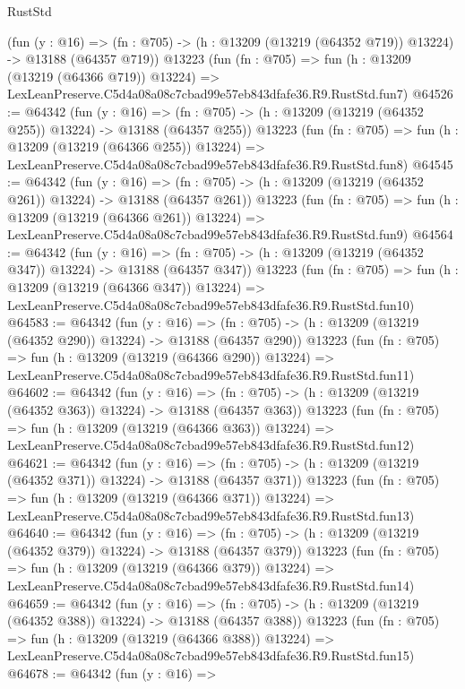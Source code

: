 \begin{lexlean}{RustStd}
\begin{coremodule}
    (fun (y : @16) =>
    (fn : @705) -> (h : @13209 (@13219 (@64352 @719)) @13224) -> @13188 (@64357 @719))
    @13223
    (fun (fn : @705) =>
    fun (h : @13209 (@13219 (@64366 @719)) @13224) =>
    LexLeanPreserve.C5d4a08a08c7cbad99e57eb843dfafe36.R9.RustStd.fun7)
@64526 := @64342
    (fun (y : @16) =>
    (fn : @705) -> (h : @13209 (@13219 (@64352 @255)) @13224) -> @13188 (@64357 @255))
    @13223
    (fun (fn : @705) =>
    fun (h : @13209 (@13219 (@64366 @255)) @13224) =>
    LexLeanPreserve.C5d4a08a08c7cbad99e57eb843dfafe36.R9.RustStd.fun8)
@64545 := @64342
    (fun (y : @16) =>
    (fn : @705) -> (h : @13209 (@13219 (@64352 @261)) @13224) -> @13188 (@64357 @261))
    @13223
    (fun (fn : @705) =>
    fun (h : @13209 (@13219 (@64366 @261)) @13224) =>
    LexLeanPreserve.C5d4a08a08c7cbad99e57eb843dfafe36.R9.RustStd.fun9)
@64564 := @64342
    (fun (y : @16) =>
    (fn : @705) -> (h : @13209 (@13219 (@64352 @347)) @13224) -> @13188 (@64357 @347))
    @13223
    (fun (fn : @705) =>
    fun (h : @13209 (@13219 (@64366 @347)) @13224) =>
    LexLeanPreserve.C5d4a08a08c7cbad99e57eb843dfafe36.R9.RustStd.fun10)
@64583 := @64342
    (fun (y : @16) =>
    (fn : @705) -> (h : @13209 (@13219 (@64352 @290)) @13224) -> @13188 (@64357 @290))
    @13223
    (fun (fn : @705) =>
    fun (h : @13209 (@13219 (@64366 @290)) @13224) =>
    LexLeanPreserve.C5d4a08a08c7cbad99e57eb843dfafe36.R9.RustStd.fun11)
@64602 := @64342
    (fun (y : @16) =>
    (fn : @705) -> (h : @13209 (@13219 (@64352 @363)) @13224) -> @13188 (@64357 @363))
    @13223
    (fun (fn : @705) =>
    fun (h : @13209 (@13219 (@64366 @363)) @13224) =>
    LexLeanPreserve.C5d4a08a08c7cbad99e57eb843dfafe36.R9.RustStd.fun12)
@64621 := @64342
    (fun (y : @16) =>
    (fn : @705) -> (h : @13209 (@13219 (@64352 @371)) @13224) -> @13188 (@64357 @371))
    @13223
    (fun (fn : @705) =>
    fun (h : @13209 (@13219 (@64366 @371)) @13224) =>
    LexLeanPreserve.C5d4a08a08c7cbad99e57eb843dfafe36.R9.RustStd.fun13)
@64640 := @64342
    (fun (y : @16) =>
    (fn : @705) -> (h : @13209 (@13219 (@64352 @379)) @13224) -> @13188 (@64357 @379))
    @13223
    (fun (fn : @705) =>
    fun (h : @13209 (@13219 (@64366 @379)) @13224) =>
    LexLeanPreserve.C5d4a08a08c7cbad99e57eb843dfafe36.R9.RustStd.fun14)
@64659 := @64342
    (fun (y : @16) =>
    (fn : @705) -> (h : @13209 (@13219 (@64352 @388)) @13224) -> @13188 (@64357 @388))
    @13223
    (fun (fn : @705) =>
    fun (h : @13209 (@13219 (@64366 @388)) @13224) =>
    LexLeanPreserve.C5d4a08a08c7cbad99e57eb843dfafe36.R9.RustStd.fun15)
@64678 := @64342
    (fun (y : @16) =>

\end{coremodule}
\end{lexlean}
